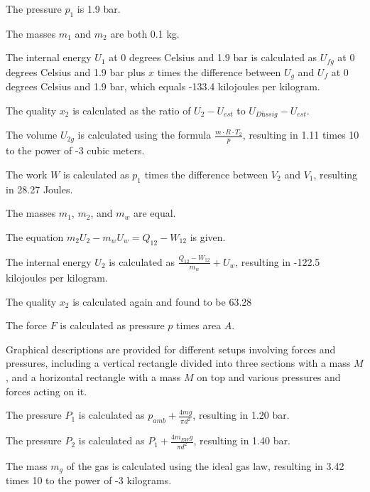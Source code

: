 The pressure \( p_1 \) is 1.9 bar.

The masses \( m_1 \) and \( m_2 \) are both 0.1 kg.

The internal energy \( U_1 \) at 0 degrees Celsius and 1.9 bar is calculated as \( U_{fg} \) at 0 degrees Celsius and 1.9 bar plus \( x \) times the difference between \( U_g \) and \( U_f \) at 0 degrees Celsius and 1.9 bar, which equals -133.4 kilojoules per kilogram.

The quality \( x_2 \) is calculated as the ratio of \( U_2 - U_{est} \) to \( U_{Düssig} - U_{est} \).

The volume \( U_{2g} \) is calculated using the formula \( \frac{m \cdot R \cdot T_2}{p} \), resulting in 1.11 times 10 to the power of -3 cubic meters.

The work \( W \) is calculated as \( p_1 \) times the difference between \( V_2 \) and \( V_1 \), resulting in 28.27 Joules.

The masses \( m_1 \), \( m_2 \), and \( m_w \) are equal.

The equation \( m_2 U_2 - m_w U_w = Q_{12} - W_{12} \) is given.

The internal energy \( U_2 \) is calculated as \( \frac{Q_{12} - W_{12}}{m_w} + U_w \), resulting in -122.5 kilojoules per kilogram.

The quality \( x_2 \) is calculated again and found to be 63.28%

The force \( F \) is calculated as pressure \( p \) times area \( A \).

Graphical descriptions are provided for different setups involving forces and pressures, including a vertical rectangle divided into three sections with a mass \( M \), and a horizontal rectangle with a mass \( M \) on top and various pressures and forces acting on it.

The pressure \( P_1 \) is calculated as \( p_{amb} + \frac{4mg}{\pi d^2} \), resulting in 1.20 bar.

The pressure \( P_2 \) is calculated as \( P_1 + \frac{4 m_{EW} g}{\pi d^2} \), resulting in 1.40 bar.

The mass \( m_g \) of the gas is calculated using the ideal gas law, resulting in 3.42 times 10 to the power of -3 kilograms.